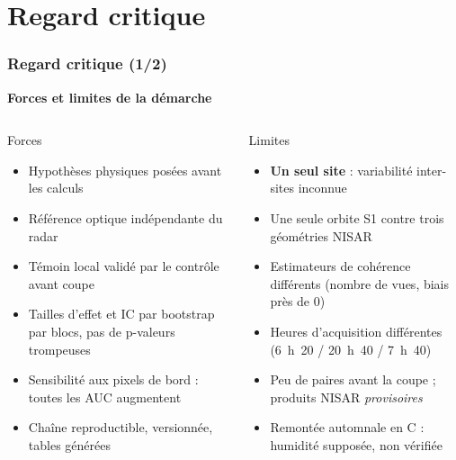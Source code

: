 \documentclass[aspectratio=169]{beamer}
\newcommand{\slidesubtitle}[1]{%
	\textcolor{myblue}{\small\textbf{#1}}%
	\par\vspace{3pt}%
}
\begin{document}
\section{Regard critique}

\begin{frame}{\phantom{x}}
	\frametitle{Regard critique (1/2)}
	\vspace{-4pt}\slidesubtitle{Forces et limites de la démarche}
	\small
	\begin{columns}[T]
		\begin{exampleblock}{Forces}
			\footnotesize
			\begin{itemize}
				\setlength{\itemsep}{1pt}
				\item Hypothèses physiques posées avant les calculs
				\item Référence optique indépendante du radar
				\item Témoin local validé par le contrôle avant coupe
				\item Tailles d'effet et IC par bootstrap par blocs, pas de p-valeurs trompeuses
				\item Sensibilité aux pixels de bord : toutes les AUC augmentent
				\item Chaîne reproductible, versionnée, tables générées
			\end{itemize}
		\end{exampleblock}

		\begin{alertblock}{Limites}
			\footnotesize
			\begin{itemize}
				\setlength{\itemsep}{1pt}
				\item \textbf{Un seul site} : variabilité inter-sites inconnue
				\item Une seule orbite S1 contre trois géométries NISAR
				\item Estimateurs de cohérence différents (nombre de vues, biais près de 0)
				\item Heures d'acquisition différentes (6~h~20 / 20~h~40 / 7~h~40)
				\item Peu de paires avant la coupe ; produits NISAR \emph{provisoires}
				\item Remontée automnale en C : humidité supposée, non vérifiée
			\end{itemize}
		\end{alertblock}
	\end{columns}
\end{frame}
\end{document}
